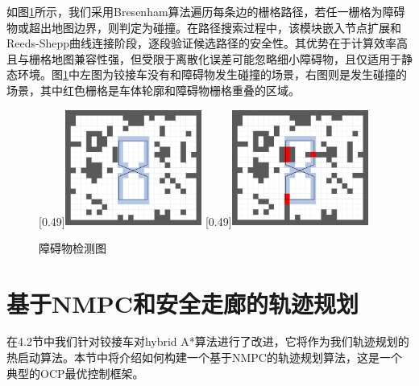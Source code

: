 \documentclass[master,academic]{ysuthesis} %
\begin{document}
		如图\ref{fig:障碍物检测图}所示，我们采用Bresenham算法\cite{bresenham1977linear}遍历每条边的栅格路径，若任一栅格为障碍物或超出地图边界，则判定为碰撞。在路径搜索过程中，该模块嵌入节点扩展和Reeds-Shepp曲线连接阶段，逐段验证候选路径的安全性。其优势在于计算效率高且与栅格地图兼容性强，但受限于离散化误差可能忽略细小障碍物，且仅适用于静态环境。图\ref{fig:障碍物检测图}中左图为铰接车没有和障碍物发生碰撞的场景，右图则是发生碰撞的场景，其中红色栅格是车体轮廓和障碍物栅格重叠的区域。
		\begin{figure}[!ht]
			\centering
			[0.49\textwidth]{\includegraphics[width=0.4\textwidth]{bresham_free.png}}
			[0.49\textwidth]{\includegraphics[width=0.4\textwidth]{bresham_colli.png}}
			\caption{障碍物检测图}
			\label{fig:障碍物检测图}
		\end{figure}
	\section{基于NMPC和安全走廊的轨迹规划}
	在4.2节中我们针对铰接车对hybrid A*算法进行了改进，它将作为我们轨迹规划的热启动算法。本节中将介绍如何构建一个基于NMPC的轨迹规划算法，这是一个典型的OCP最优控制框架。
\end{document}
